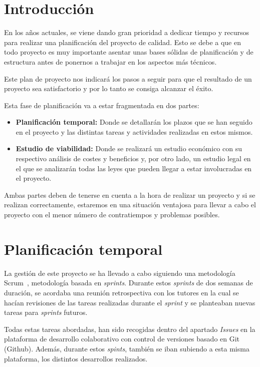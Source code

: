 
\section{Introducción}
En los años actuales, se viene dando gran prioridad a dedicar tiempo y recursos para realizar una  planificación del proyecto de calidad. Esto se debe a que en todo proyecto es muy importante asentar unas bases sólidas de planificación y de estructura antes de ponernos a trabajar en los aspectos más técnicos.

Este plan de proyecto nos indicará los pasos a seguir para que el resultado de un proyecto sea satisfactorio y por lo tanto se consiga alcanzar el éxito.

Esta fase de planificación va a estar fragmentada en dos partes:
\begin{itemize}
\item 
\textbf{Planificación temporal: } Donde se detallarán los plazos que se han seguido en el proyecto y las distintas tareas y actividades realizadas en estos mismos.
\item 
\textbf{Estudio de viabilidad: } Donde se realizará un estudio económico con su respectivo análisis de costes y beneficios y, por otro lado, un estudio legal en el que se analizarán todas las leyes que pueden llegar a estar involucradas en el proyecto.
\end{itemize}

Ambas partes deben de tenerse en cuenta a la hora de realizar un proyecto y si se realizan correctamente, estaremos en una situación ventajosa para llevar a cabo el proyecto con el menor número de contratiempos y problemas posibles. 
\section{Planificación temporal}
La gestión de este proyecto se ha llevado a cabo siguiendo una metodología Scrum~\cite{scrum:latex}, metodología basada en \textit{sprints}. Durante estos \textit{sprints} de dos semanas de duración, se acordaba una reunión retrospectiva con los tutores en la cual se hacían revisiones de las tareas realizadas durante el \textit{sprint} y se planteaban nuevas tareas para \textit{sprints} futuros.

Todas estas tareas abordadas, han sido recogidas dentro del apartado \textit{Issues} en la plataforma de desarrollo colaborativo con control de versiones basado en Git (Github). Además, durante estos \textit{spints}, también se iban subiendo a esta misma plataforma, los distintos desarrollos realizados.

